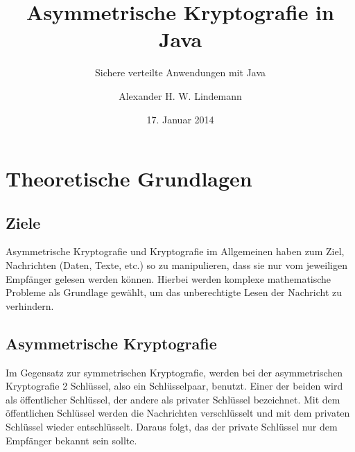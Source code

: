 \documentclass[11pt,a4paper]{scrreprt}
\begin{document}
\title{Asymmetrische Kryptografie in Java}
\subtitle{Sichere verteilte Anwendungen mit Java\\
		}
\author{Alexander H. W. Lindemann}
\date{17. Januar 2014}
\maketitle

\tableofcontents

\chapter{Theoretische Grundlagen}
\section{Ziele}
Asymmetrische Kryptografie und Kryptografie im Allgemeinen haben zum Ziel, Nachrichten (Daten, Texte, etc.) so zu manipulieren, dass sie nur vom jeweiligen Empfänger gelesen werden können. Hierbei werden komplexe mathematische Probleme als Grundlage gewählt, um das unberechtigte Lesen der Nachricht zu verhindern.

\section{Asymmetrische Kryptografie}
Im Gegensatz zur symmetrischen Kryptografie, werden bei der asymmetrischen Kryptografie 2 Schlüssel, also ein Schlüsselpaar, benutzt. Einer der beiden wird als öffentlicher Schlüssel, der andere als privater Schlüssel bezeichnet. Mit dem öffentlichen Schlüssel werden die Nachrichten verschlüsselt und mit dem privaten Schlüssel wieder entschlüsselt. Daraus folgt, das der private Schlüssel nur dem Empfänger bekannt sein sollte. 
\end{document}
